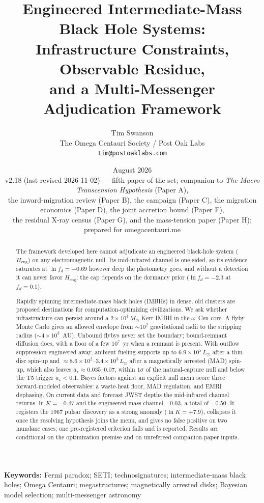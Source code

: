 \documentclass[11pt]{article}
\title{\textbf{Engineered Intermediate-Mass Black Hole Systems:\\
Infrastructure Constraints, Observable Residue,\\
and a Multi-Messenger Adjudication Framework}}
\author{Tim Swanson\\[2pt]
\small The Omega Centauri Society / Post Oak Labs\\
\small \texttt{tim@postoaklabs.com}}
\date{August 2026 \\[4pt] \small v2.18 (last revised 2026-11-02) --- fifth paper of the set; companion to \emph{The Macro Transcension Hypothesis} (Paper A),\\ \small the inward-migration review (Paper B), the \ocen{} campaign (Paper C), the migration economics (Paper D), the joint accretion bound (Paper F),\\ \small the residual X-ray census (Paper G), and the mass-tension paper (Paper H);\\ \small prepared for omegacentauri.me}
\newcommand{\msun}{\ensuremath{M_\odot}}
\newcommand{\astar}{\ensuremath{a_\star}}
\newcommand{\ocen}{\ensuremath{\omega}~Cen}
\newcommand{\lnK}{\ensuremath{\ln K}}
\newcommand{\Heng}{\ensuremath{H_{\mathrm{eng}}}}
\begin{document}
\maketitle

\begin{abstract}
\noindent
The framework developed here cannot adjudicate an engineered black-hole system (\Heng) on any electromagnetic null. Its mid-infrared channel is one-sided, so its evidence saturates at $\ln f_{d} = -0.69$ however deep the photometry goes, and without a detection it can never favor \Heng; the cap depends on the dormancy prior ($\ln f_{d} = -2.3$ at $f_{d} = 0.1$).

Rapidly spinning intermediate-mass black holes (IMBHs) in dense, old clusters are proposed destinations for computation-optimizing civilizations. We ask whether infrastructure can persist around a $2\times10^{4}\,\msun$ Kerr IMBH in the \ocen{} core. A flyby Monte Carlo gives an allowed envelope from $\sim 10^{2}$ gravitational radii to the stripping radius ($\sim 4\times10^{3}$~AU). Unbound flybys never set the boundary; bound-remnant diffusion does, with a floor of a few $10^{7}$~yr when a remnant is present. With outflow suppression engineered away, ambient fueling supports up to $6.9\times10^{5}\,L_{\odot}$ after a thin-disc spin-up and $\approx 8.6\times10^{2}$--$3.4\times10^{3}\,L_{\odot}$ after a magnetically arrested (MAD) spin-up, which also leaves $\astar \approx 0.035$--$0.07$, within $1\sigma$ of the natural-capture null and below the T5 trigger $\astar < 0.1$. Bayes factors against an explicit null menu score three forward-modeled observables: a waste-heat floor, MAD regulation, and EMRI dephasing. On current data and forecast JWST depths the mid-infrared channel returns $\lnK = -0.47$ and the engineered-mass channel $-0.03$, a total of $-0.50$. It registers the 1967 pulsar discovery as a strong anomaly ($\lnK = +7.9$), collapses it once the resolving hypothesis joins the menu, and gives no false positive on two mundane cases; one pre-registered criterion fails and is reported. Results are conditional on the optimization premise and on unrefereed companion-paper inputs.


\end{abstract}

\bigskip
\noindent\textbf{Keywords:} Fermi paradox; SETI; technosignatures; intermediate-mass black holes; Omega Centauri; megastructures; magnetically arrested disks; Bayesian model selection; multi-messenger astronomy

\newpage
\tableofcontents
\newpage
\end{document}
